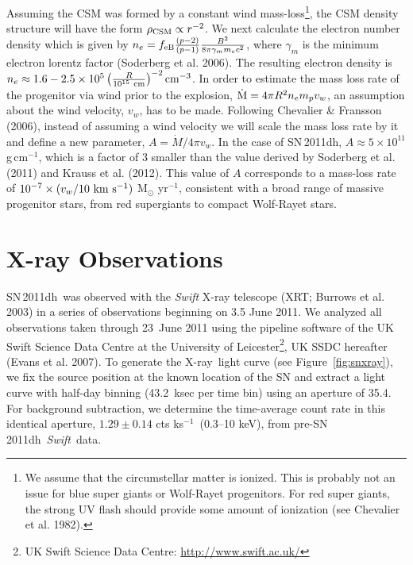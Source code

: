 \documentclass{emulateapj}
\newcommand{\sn}{\mbox{SN\,2011dh}}
\newcommand{\xray}{\mbox{X-ray}}
\newcommand{\swift}{\mbox{\it Swift}}
\newcommand{\perksec}{\mbox{ks$^{-1}$}}
\begin{document}
Assuming the CSM was formed by a constant wind mass-loss\footnote{We assume that the circumstellar matter is ionized. This
  is probably not an issue for blue super giants or Wolf-Rayet
  progenitors. For red super giants, the strong UV flash should
  provide some amount of ionization (see Chevalier et al. 1982).
}, 
the CSM
density structure will have the form $\rho_{\rm CSM}\propto r^{-2}$. We next calculate the
electron number density which is given by
$n_{e}=f_{\rm eB} \frac{(p-2)}{(p-1)}\frac{B^{2}}{8 \pi \gamma _{m} m_{e}
  c^{2}}$, where $\gamma _{m}$ is the minimum electron lorentz
factor (Soderberg et al. 2006). The resulting electron density is $n_{e}\approx 1.6-2.5\times
10^{5} \left(\frac{R}{10^{15}~{\rm cm}}\right)^{-2}{\rm cm}^{-3}$. In order to estimate the mass loss rate of the
progenitor via wind prior to the explosion, $\dot{{\rm M}} = 4\pi
R^{2} n_{e} m_{p} v_{w}$, an assumption about the wind velocity,
$v_{w}$, has to be made. Following
Chevalier \& Fransson (2006), instead of assuming a wind velocity we
will scale the mass loss rate by it and define a new parameter, 
$A={\dot M}/{4\pi v_{w}}$. In the case of SN\,2011dh, $A\approx
5\times 10^{11}$ g\,cm$^{-1}$, which is a factor of $3$ smaller than the value
derived by Soderberg et al. (2011) and Krauss et al. (2012). 
This value of $A$ corresponds to a mass-loss rate of $10^{-7}\times
(v_{w}/10 ~{\rm km~s^{-1}})$ M$_{\odot}$ yr$^{-1}$, 
consistent with a broad range of
massive progenitor stars, from red supergiants to compact Wolf-Rayet
stars. 




\section{X-ray Observations}
\label{sec:Xray}

\sn\ was observed with the {\it Swift} X-ray telescope (XRT; Burrows et al. 2003) in a
series of observations beginning on 3.5 June 2011.  We
analyzed all observations
taken through 23~June 2011 using the pipeline software of the UK Swift
Science Data Centre at the University of Leicester\footnote{UK Swift
  Science Data Centre: \url{http://www.swift.ac.uk/}}, UK SSDC
hereafter (Evans et al. 2007). To generate the \xray\ light curve (see
Figure~\ref{fig:snxray}), we fix the source position at the
known location of the SN and extract a light curve with half-day
binning (43.2~ksec per time bin) using an aperture of
35.4\arcsec. For background subtraction, we determine the time-average count rate in this identical aperture, $1.29\pm 0.14$
cts \perksec\ (0.3--10 keV), from pre-\sn\ \swift\ data.
\end{document}
